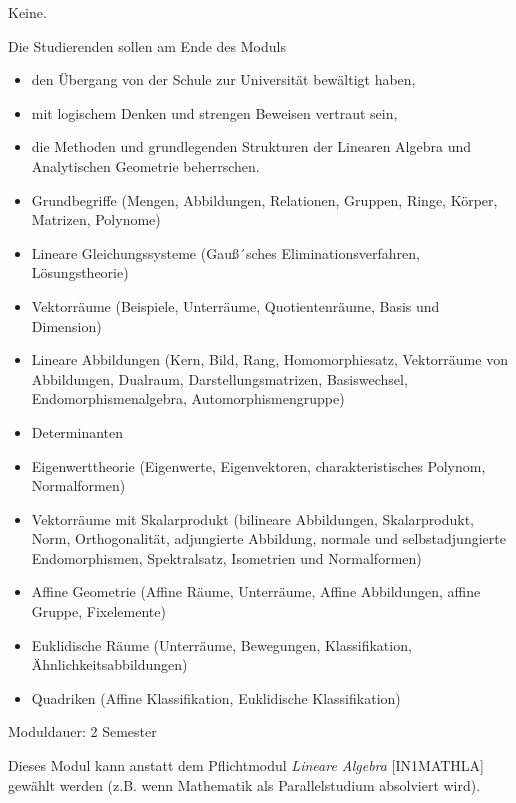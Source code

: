\begin{module}
\begin{styleenv}
\begin{assessment}
\end{assessment}

\begin{conditions}Keine.\end{conditions}


\end{styleenv}

\begin{learningoutcomes}
Die Studierenden sollen am Ende des Moduls

 \begin{itemize}\item den Übergang von der Schule zur Universität bewältigt haben,  \item mit logischem Denken und strengen Beweisen vertraut sein,   \item die Methoden und grundlegenden Strukturen der Linearen Algebra und Analytischen Geometrie beherrschen.  \end{itemize}
\end{learningoutcomes}

\begin{content}
\begin{itemize}\item Grundbegriffe (Mengen, Abbildungen, Relationen, Gruppen, Ringe, Körper, Matrizen, Polynome)   \item Lineare Gleichungssysteme (Gauß´sches Eliminationsverfahren, Lösungstheorie)   \item Vektorräume (Beispiele, Unterräume, Quotientenräume, Basis und Dimension)   \item Lineare Abbildungen (Kern, Bild, Rang, Homomorphiesatz, Vektorräume von Abbildungen, Dualraum, Darstellungsmatrizen, Basiswechsel, Endomorphismenalgebra, Automorphismengruppe)   \item Determinanten   \item Eigenwerttheorie (Eigenwerte, Eigenvektoren, charakteristisches Polynom, Normalformen)  \item Vektorräume mit Skalarprodukt (bilineare Abbildungen, Skalarprodukt, Norm, Orthogonalität, adjungierte Abbildung, normale und selbstadjungierte Endomorphismen, Spektralsatz, Isometrien und Normalformen)  \item Affine Geometrie (Affine Räume, Unterräume, Affine Abbildungen, affine Gruppe, Fixelemente)  \item Euklidische Räume (Unterräume, Bewegungen, Klassifikation, Ähnlichkeitsabbildungen)  \item Quadriken (Affine Klassifikation, Euklidische Klassifikation)  \end{itemize}
\end{content}

\begin{remarks}Moduldauer: 2 Semester

 

Dieses Modul kann anstatt dem Pflichtmodul\emph{ Lineare Algebra} [IN1MATHLA] gewählt werden (z.B. wenn Mathematik als Parallelstudium absolviert wird).

\end{remarks}

\end{module}

